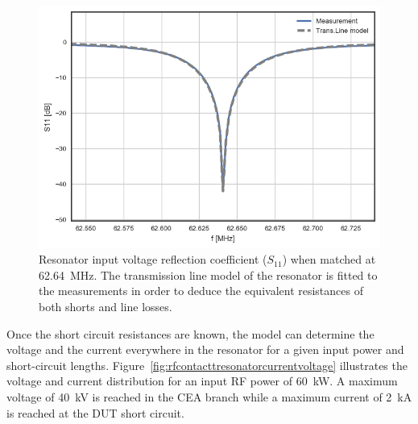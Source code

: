 {\begin{figure}[h]
	\centering
	\includegraphics[width=1.0\linewidth]{figures/chap3/RF_contacts/RF_contact_Tresonator_S11}
	\caption{Resonator input voltage reflection coefficient ($S_{11}$) when matched at 62.64~MHz. The transmission line model of the resonator is fitted to the measurements in order to deduce the equivalent resistances of both shorts and line losses. }
	\label{fig:rfcontacttresonators11}
\end{figure}


Once the short circuit resistances are known, the model can determine the voltage and the current everywhere in the resonator for a given input power and short-circuit lengths. Figure~\ref{fig:rfcontacttresonatorcurrentvoltage} illustrates the voltage and current distribution for an input RF power of 60~kW. A maximum voltage of 40~kV is reached in the CEA branch while a maximum current of 2~kA is reached at the DUT short circuit. 

}

